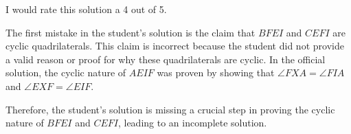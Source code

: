 I would rate this solution a 4 out of 5.

The first mistake in the student's solution is the claim that $BFEI$ and $CEFI$ are cyclic quadrilaterals. This claim is incorrect because the student did not provide a valid reason or proof for why these quadrilaterals are cyclic. In the official solution, the cyclic nature of $AEIF$ was proven by showing that $\angle FXA = \angle FIA$ and $\angle EXF = \angle EIF$.

Therefore, the student's solution is missing a crucial step in proving the cyclic nature of $BFEI$ and $CEFI$, leading to an incomplete solution.
